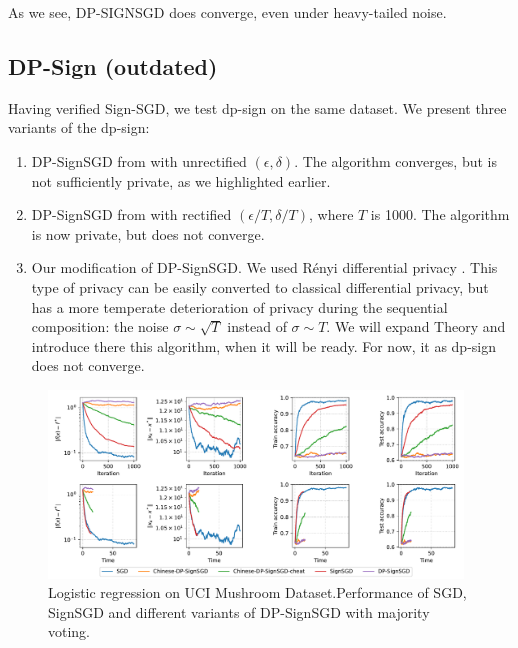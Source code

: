 \documentclass[12pt]{article}
\begin{document}
As we see, {\scriptsize DP-SIGN}SGD does converge, even under heavy-tailed noise.

\subsection{DP-Sign (outdated)}
Having verified Sign-SGD, we test dp-sign on the same dataset. We present three variants of the dp-sign:
\begin{enumerate}
    \item DP-SignSGD from \cite{Jin2020} with unrectified $(\epsilon, \delta)$. The algorithm converges, but is not sufficiently private, as we highlighted earlier.
    \item DP-SignSGD from \cite{Jin2020} with rectified $(\epsilon / T, \delta /T)$, where $T$ is 1000. The algorithm is now private, but does not converge.
    \item Our modification of DP-SignSGD. We used Rényi differential privacy \cite{Dwork2014}. This type of privacy can be easily converted to classical differential privacy, but has a more temperate deterioration of privacy during the sequential composition: the noise $\sigma \sim \sqrt{T}$ instead of $\sigma \sim T$. We will expand Theory and introduce there this algorithm, when it will be ready. For now, it as dp-sign does not converge.
\end{enumerate}
\begin{figure}[h]
    \centering
    \includegraphics[width=0.98\textwidth]{../figs/dps_diverge.pdf}
    \caption{Logistic regression on UCI Mushroom Dataset.\newline Performance of SGD, SignSGD and different variants of DP-SignSGD with majority voting.}
    \label{fig:dp-diverges}
\end{figure}
\end{document}
